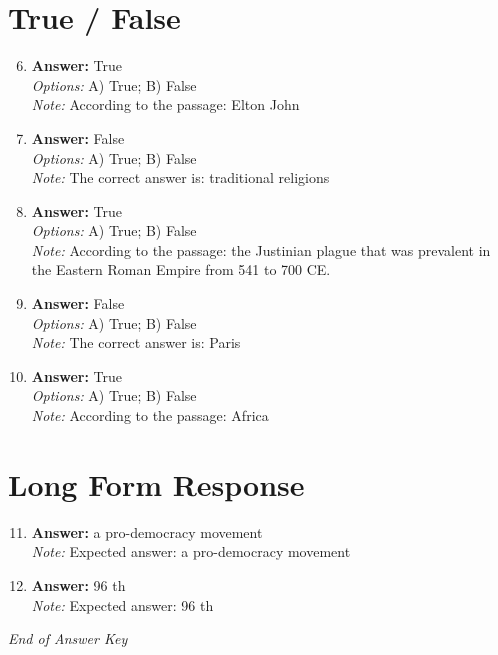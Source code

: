 \documentclass[12pt]{article}
\begin{document}
\section*{True / False}
\begin{enumerate}[label=\arabic*.]
\setcounter{enumi}{5}
\item \textbf{Answer:} True
\\ \textit{Options:} A) True; B) False
\\ \textit{Note:} According to the passage: Elton John
\item \textbf{Answer:} False
\\ \textit{Options:} A) True; B) False
\\ \textit{Note:} The correct answer is: traditional religions
\item \textbf{Answer:} True
\\ \textit{Options:} A) True; B) False
\\ \textit{Note:} According to the passage: the Justinian plague that was prevalent in the Eastern Roman Empire from 541 to 700 CE.
\item \textbf{Answer:} False
\\ \textit{Options:} A) True; B) False
\\ \textit{Note:} The correct answer is: Paris
\item \textbf{Answer:} True
\\ \textit{Options:} A) True; B) False
\\ \textit{Note:} According to the passage: Africa
\end{enumerate}

\section*{Long Form Response}
\begin{enumerate}[label=\arabic*.]
\setcounter{enumi}{10}
\item \textbf{Answer:} a pro-democracy movement
\\ \textit{Note:} Expected answer: a pro-democracy movement
\item \textbf{Answer:} 96 th
\\ \textit{Note:} Expected answer: 96 th
\end{enumerate}

\vfill
\noindent\textit{End of Answer Key}
\end{document}
